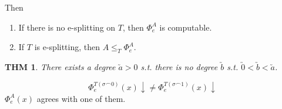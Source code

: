 \documentclass[12pt]{article}
\begin{document}
Then
\begin{enumerate}
  \item If there is no e-splitting on $T$,
    then $\Phi^A_e$ is computable.
  \item If $T$ is e-splitting, then $A \le_T \Phi^A_e$. 
\end{enumerate}

\newtheorem*{existsdeg}{THM}
\begin{existsdeg}
  There exists a degree $\utilde{a} > 0$ s.t. 
  there is no degree $\utilde{b}$ s.t. $\utilde{0} < \utilde{b} < \utilde{a}$.
\end{existsdeg}

\[
\Phi_e^{T(\sigma\frown 0)}(x)\downarrow \ne 
\Phi_e^{T(\sigma\frown 1)}(x)\downarrow
\]
$\Phi_e^{A}(x)$ agrees with one of them.
\end{document}
